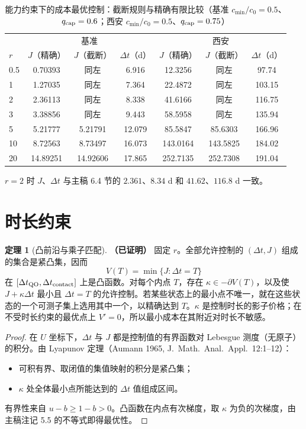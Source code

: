 \documentclass[11pt,a4paper]{ctexart}
\theoremstyle{definition}
\newtheorem{theorem}{定理}[section]
\theoremstyle{definition}
\newcommand{\QO}{\mathrm{QO}}
\newcommand{\proven}{\textbf{（已证明）}}
\begin{document}
\begin{table}[htbp]\centering\small
\caption{能力约束下的成本最优控制：截断规则与精确有限比较（基准 $c_{\min}/c_0=0.5$、$q_{\rm cap}=0.6$；西安 $c_{\min}/c_0=0.5$、$q_{\rm cap}=0.75$）}\label{tab:cap}
\begin{tabular}{@{}lccc@{\qquad}ccc@{}}\toprule
 & \multicolumn{3}{c}{基准} & \multicolumn{3}{c}{西安}\\
$r$ & $J$（精确） & $J$（截断） & $\Delta t$（d） & $J$（精确） & $J$（截断） & $\Delta t$（d）\\\midrule
0.5 & 0.70393 & 同左 & 6.916 & 12.3256 & 同左 & 97.74\\
1 & 1.27035 & 同左 & 7.364 & 22.4872 & 同左 & 103.15\\
2 & 2.36113 & 同左 & 8.338 & 41.6166 & 同左 & 116.75\\
3 & 3.38856 & 同左 & 9.443 & 58.5958 & 同左 & 135.94\\
5 & 5.21777 & 5.21791 & 12.079 & 85.5847 & 85.6303 & 166.96\\
10 & 8.72563 & 8.73497 & 16.073 & 143.0164 & 143.5825 & 184.02\\
20 & 14.89251 & 14.92606 & 17.865 & 252.7135 & 252.7308 & 191.04\\\bottomrule
\end{tabular}
\par\smallskip\footnotesize $r=2$ 时 $J$、$\Delta t$ 与主稿 6.4 节的 $2.361$、$8.34$ d 和 $41.62$、$116.8$ d 一致。
\end{table}

\section{时长约束}
\label{sec:duration}

\begin{theorem}[凸前沿与乘子匹配]\label{thm:frontier}\proven
固定 $r$。全部允许控制的 $(\Delta t,J)$ 组成的集合是紧凸集，因而
\[
V(T)=\min\{J:\Delta t=T\}
\]
在 $[\Delta t_{\QO},\Delta t_{\rm contact}]$ 上是凸函数。对每个内点 $T$，存在 $\kappa\in-\partial V(T)$，以及使 $J+\kappa\Delta t$ 最小且 $\Delta t=T$ 的允许控制。若某些状态上的最小点不唯一，就在这些状态的一个可测子集上选用其中一个，以精确达到 $T$。$\kappa$ 是控制时长的影子价格；在不受时长约束的最优点上 $V'=0$，所以最小成本在其附近对时长不敏感。
\end{theorem}
\begin{proof}
在 $U$ 坐标下，$\Delta t$ 与 $J$ 都是控制值的有界函数对 Lebesgue 测度（无原子）的积分。由 Lyapunov 定理（Aumann 1965, J.\ Math.\ Anal.\ Appl.\ 12:1--12）：
\begin{itemize}
\item 可积有界、取闭值的集值映射的积分是紧凸集；
\item $\kappa$ 处全体最小点所能达到的 $\Delta t$ 值组成区间。
\end{itemize}
有界性来自 $u-b\ge1-b>0$。凸函数在内点有次梯度，取 $\kappa$ 为负的次梯度，由主稿注记 5.5 的不等式即得最优性。
\end{proof}
\end{document}
